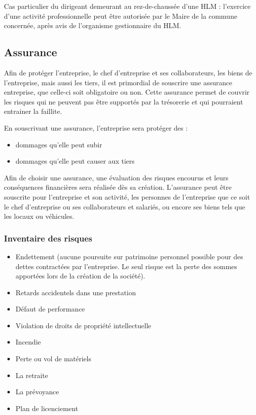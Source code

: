 \documentclass[10pt]{article}
\begin{document}
Cas particulier du dirigeant demeurant au rez-de-chaussée d'une HLM : l'exercice d'une activité professionnelle peut être autorisée par le Maire de la commune concernée, après avis de l'organisme gestionnaire du HLM.

\subsection{Assurance}
\label{sub:assurance}
Afin de protéger l'entreprise, le chef d'entreprise et ses collaborateurs, les biens de l'entreprise, mais aussi les tiers, il est primordial de souscrire une assurance entreprise, que celle-ci soit obligatoire ou non. Cette assurance permet de couvrir les risques qui ne peuvent pas être supportés par la trésorerie et qui pourraient entrainer la faillite.

En souscrivant une assurance, l'entreprise sera protéger des :
\begin{itemize}
	\item dommages qu'elle peut subir
	\item dommages qu'elle peut causer aux tiers
\end{itemize} 

Afin de choisir une assurance, une évaluation des risques encourus et leurs conséquences financières sera réalisée dès sa création. L'assurance peut être souscrite pour l'entreprise et son activité, les personnes de l'entreprise que ce soit le chef d'entreprise ou ses collaborateurs et salariés, ou encore ses biens tels que les locaux ou véhicules.\\

\subsubsection{Inventaire des risques}
\label{ssub:inventaire_risques}
\begin{itemize}
	\item Endettement (aucune poursuite sur patrimoine personnel possible pour des dettes contractées par l'entreprise. Le seul risque est la perte des sommes apportées lors de la création de la société).
	\item Retards accidentels dans une prestation
	\item Défaut de performance
	\item Violation de droits de propriété intellectuelle
	\item Incendie
	\item Perte ou vol de matériels
	\item La retraite
	\item La prévoyance
	\item Plan de licenciement\\
\end{itemize}
\end{document}
